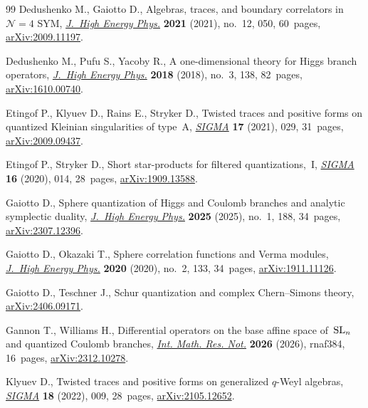\documentclass[pdftex]{sigma}
\numberwithin{equation}{section}
\theoremstyle{definition}
\begin{document}
\begin{thebibliography}{99}
Dedushenko M., Gaiotto D., Algebras, traces, and boundary correlators
 in~{$\mathcal N = 4$} {SYM},
 \href{https://doi.org/10.1007/jhep12(2021)050}{\textit{J.~High Energy Phys.}}
 \textbf{2021} (2021), no.~12, 050, 60~pages,
 \href{http://arxiv.org/abs/2009.11197}{arXiv:2009.11197}.

Dedushenko M., Pufu S., Yacoby R., A one-dimensional theory for {H}iggs branch
 operators, \href{https://doi.org/10.1007/jhep03(2018)138}{\textit{J.~High
 Energy Phys.}} \textbf{2018} (2018), no.~3, 138, 82~pages,
 \href{http://arxiv.org/abs/1610.00740}{arXiv:1610.00740}.

Etingof P., Klyuev D., Rains E., Stryker D., Twisted traces and positive forms
 on quantized {K}leinian singularities of type~{A},
 \href{https://doi.org/10.3842/SIGMA.2021.029}{\textit{SIGMA}} \textbf{17}
 (2021), 029, 31~pages,
 \href{http://arxiv.org/abs/2009.09437}{arXiv:2009.09437}.

Etingof P., Stryker D., Short star-products for filtered quantizations,~{I},
 \href{https://doi.org/10.3842/SIGMA.2020.014}{\textit{SIGMA}} \textbf{16}
 (2020), 014, 28~pages,
 \href{http://arxiv.org/abs/1909.13588}{arXiv:1909.13588}.

Gaiotto D., Sphere quantization of {H}iggs and {C}oulomb branches and analytic
 symplectic duality,
 \href{https://doi.org/10.1007/JHEP01(2025)188}{\textit{J.~High Energy Phys.}}
 \textbf{2025} (2025), no.~1, 188, 34~pages,
 \href{http://arxiv.org/abs/2307.12396}{arXiv:2307.12396}.

Gaiotto D., Okazaki T., Sphere correlation functions and {V}erma modules,
 \href{https://doi.org/10.1007/jhep02(2020)133}{\textit{J.~High Energy Phys.}}
 \textbf{2020} (2020), no.~2, 133, 34~pages,
 \href{http://arxiv.org/abs/1911.11126}{arXiv:1911.11126}.

Gaiotto D., Teschner J., Schur quantization and complex {C}hern--{S}imons
 theory, \href{http://arxiv.org/abs/2406.09171}{arXiv:2406.09171}.

Gannon T., Williams H., Differential operators on the base affine space
 of~{${\rm SL}_n$} and quantized {C}oulomb branches,
 \href{https://doi.org/10.1093/imrn/rnaf384}{\textit{Int. Math. Res. Not.}}
 \textbf{2026} (2026), rnaf384, 16~pages,
 \href{http://arxiv.org/abs/2312.10278}{arXiv:2312.10278}.

Klyuev D., Twisted traces and positive forms on generalized {$q$}-{W}eyl
 algebras, \href{https://doi.org/10.3842/SIGMA.2022.009}{\textit{SIGMA}}
 \textbf{18} (2022), 009, 28~pages,
 \href{http://arxiv.org/abs/2105.12652}{arXiv:2105.12652}.


\end{thebibliography}
\end{document}
